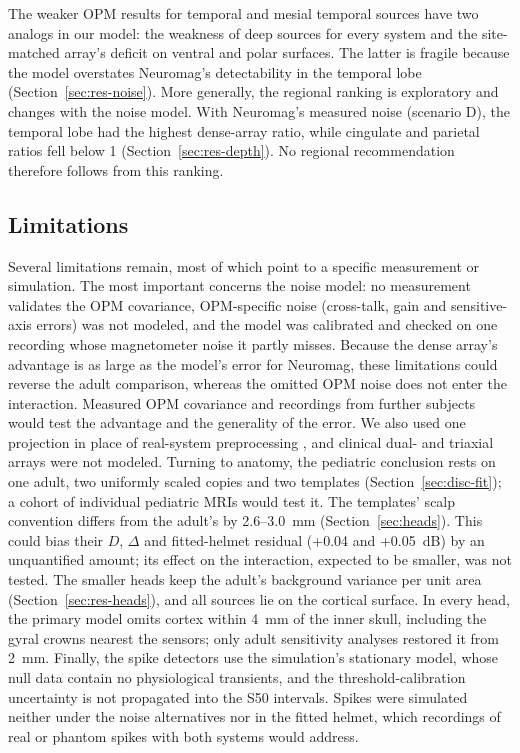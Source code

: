 \documentclass[preprint,12pt,authoryear,a4paper]{elsarticle}
\begin{document}
The weaker OPM results for temporal and mesial temporal sources \citep{feys2024,feys2025,shen2026} have two analogs in our model: the weakness of deep sources for every system and the site-matched array's deficit on ventral and polar surfaces. The latter is fragile because the model overstates Neuromag's detectability in the temporal lobe (Section~\ref{sec:res-noise}). More generally, the regional ranking is exploratory and changes with the noise model. With Neuromag's measured noise (scenario D), the temporal lobe had the highest dense-array ratio, while cingulate and parietal ratios fell below 1 (Section~\ref{sec:res-depth}). No regional recommendation therefore follows from this ranking.

\subsection{Limitations}\label{sec:limitations}

Several limitations remain, most of which point to a specific measurement or simulation. The most important concerns the noise model: no measurement validates the OPM covariance, OPM-specific noise (cross-talk, gain and sensitive-axis errors) was not modeled, and the model was calibrated and checked on one recording whose magnetometer noise it partly misses. Because the dense array's advantage is as large as the model's error for Neuromag, these limitations could reverse the adult comparison, whereas the omitted OPM noise does not enter the interaction. Measured OPM covariance and recordings from further subjects would test the advantage and the generality of the error. We also used one projection in place of real-system preprocessing \citep{taulu2006,tierney2021}, and clinical dual- and triaxial arrays were not modeled. Turning to anatomy, the pediatric conclusion rests on one adult, two uniformly scaled copies and two templates (Section~\ref{sec:disc-fit}); a cohort of individual pediatric MRIs would test it. The templates' scalp convention differs from the adult's by 2.6–3.0~mm (Section~\ref{sec:heads}). This could bias their $D$, $\Delta$ and fitted-helmet residual (+0.04 and +0.05~dB) by an unquantified amount; its effect on the interaction, expected to be smaller, was not tested. The smaller heads keep the adult's background variance per unit area (Section~\ref{sec:res-heads}), and all sources lie on the cortical surface. In every head, the primary model omits cortex within 4~mm of the inner skull, including the gyral crowns nearest the sensors; only adult sensitivity analyses restored it from 2~mm. Finally, the spike detectors use the simulation's stationary model, whose null data contain no physiological transients, and the threshold-calibration uncertainty is not propagated into the S50 intervals. Spikes were simulated neither under the noise alternatives nor in the fitted helmet, which recordings of real or phantom spikes with both systems would address.
\end{document}
